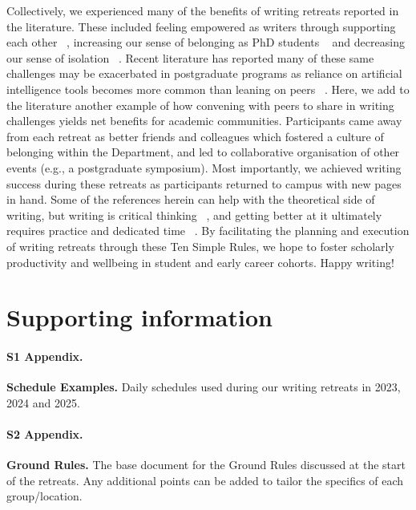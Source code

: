 \documentclass[10pt,letterpaper]{article}
\begin{document}
Collectively, we experienced many of the benefits of writing retreats reported in the literature. These included feeling empowered as writers through supporting each other ~\cite{papen2018}, increasing our sense of belonging as PhD students ~\cite{omeara2017} and decreasing our sense of isolation ~\cite{eardley2021}. Recent literature has reported many of these same challenges may be exacerbated in postgraduate programs as reliance on artificial intelligence tools becomes more common than leaning on peers ~\cite{crawford2024artificial}. Here, we add to the literature another example of how convening with peers to share in writing challenges yields net benefits for academic communities. Participants came away from each retreat as better friends and colleagues which fostered a culture of belonging within the Department, and led to collaborative organisation of other events (e.g., a postgraduate symposium). Most importantly, we achieved writing success during these retreats as participants returned to campus with new pages in hand. Some of the references herein can help with the theoretical side of writing, but writing is critical thinking ~\cite{arapoff1967, menary2007}, and getting better at it ultimately requires practice and dedicated time ~\cite{peterson2018, grogan2021}. By facilitating the planning and execution of writing retreats through these Ten Simple Rules, we hope to foster scholarly productivity and wellbeing in student and early career cohorts. Happy writing!

\section*{Supporting information}

\paragraph*{S1 Appendix.}
\label{S1_Appendix}
{\bf Schedule Examples.} Daily schedules used during our writing retreats in 2023, 2024 and 2025.

\paragraph*{S2 Appendix.}
\label{S2_Appendix}
{\bf Ground Rules.} The base document for the Ground Rules discussed at the start of the retreats. Any additional points can be added to tailor the specifics of each group/location.
\end{document}
